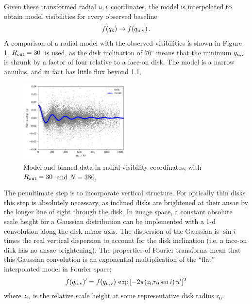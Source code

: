 \documentclass[fleqn,usenatbib]{mnras}
\begin{document}
Given these transformed radial $u,v$ coordinates, the model is interpolated to obtain model visibilities for every observed baseline
\begin{equation}
    \Tilde{f}(q_{\rm k}) \rightarrow \Tilde{f}(q_{\rm u,v}) \, .
\end{equation}
A comparison of a radial model with the observed visibilities is shown in Figure \ref{fig:model}. $R_{\rm out}=30$\arcsec~is used, as the disk inclination of 76$^\circ$ means that the minimum $q_{\rm u,v}$ is shrunk by a factor of four relative to a face-on disk. The model is a narrow annulus, and in fact has little flux beyond 1.1\arcsec.

\begin{figure}
    \centering
    \hspace{-0.5cm}\includegraphics[width=0.5\textwidth]{model.png}
    \caption{Model and binned data in radial visibility coordinates, with $R_{\rm out} = 30$\arcsec~and $N=380$.}
    \label{fig:model}
\end{figure}

The penultimate step is to incorporate vertical structure. For optically thin disks this step is absolutely necessary, as inclined disks are brightened at their ansae by the longer line of sight through the disk. In image space, a constant absolute scale height for a Gaussian distribution can be implemented with a 1-d convolution along the disk minor axis. The dispersion of the Gaussian is $\sin i$ times the real vertical dispersion to account for the disk inclination (i.e. a face-on disk has no ansae brightening). The properties of Fourier transforms mean that this Gaussian convolution is an exponential multiplication of the ``flat'' interpolated model in Fourier space;
\begin{equation}\label{eq:vert}
    \Tilde{f}(q_{\rm u,v})' = \Tilde{f}(q_{\rm u,v}) \, \exp{[-2 \pi (z_{\rm h} r_0 \sin i) \, u']^2}
\end{equation}
where $z_{\rm h}$ is the relative scale height at some representative disk radius $r_0$.
\end{document}

